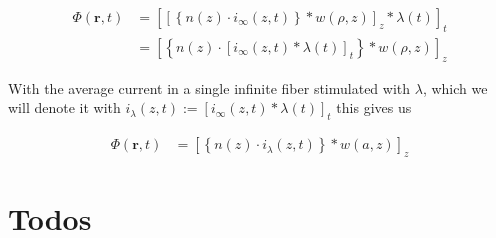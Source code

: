 \documentclass[]{article}
\begin{document}
\begin{align}
  \label{eqn:switchedpot}
  \Phi(\mathbf{r},t) & =  \left[\left[\left\{n(z)\cdot i_{\infty}(z,t)\right\}\ast w(\rho,z)\right]_z \ast \lambda(t)\right]_t \\
  & =  \left[\left\{n(z)\cdot \left[i_{\infty}(z,t)\ast \lambda(t)\right]_t\right\}\ast w(\rho,z)\right]_z
\end{align}

With the average current in a single infinite fiber stimulated with
\(\lambda\), which we will denote it with
\(i_\lambda(z,t) := \left[i_{\infty}(z,t)\ast \lambda(t)\right]_t\) this
gives us

\begin{align}
  \Phi(\mathbf{r},t) & =  \left[\left\{n(z)\cdot i_\lambda(z,t)\right\}\ast w(a,z)\right]_z
  \label{eqn:switchedpotend}
\end{align}

\section{Todos}\label{todos}
\end{document}
